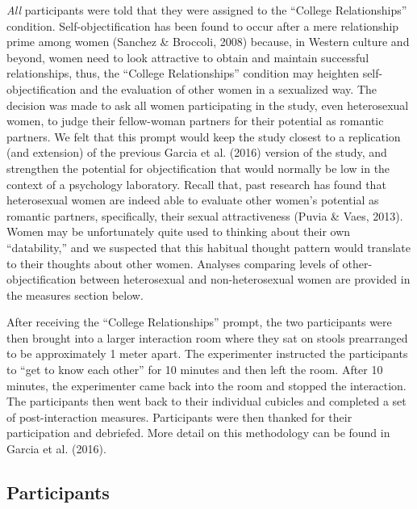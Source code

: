 \documentclass[man]{apa6}
\begin{document}
\emph{All} participants were told that they were assigned to the
\enquote{College Relationships} condition. Self-objectification has been
found to occur after a mere relationship prime among women (Sanchez \&
Broccoli, 2008) because, in Western culture and beyond, women need to
look attractive to obtain and maintain successful relationships, thus,
the \enquote{College Relationships} condition may heighten
self-objectification and the evaluation of other women in a sexualized
way. The decision was made to ask all women participating in the study,
even heterosexual women, to judge their fellow-woman partners for their
potential as romantic partners. We felt that this prompt would keep the
study closest to a replication (and extension) of the previous Garcia et
al. (2016) version of the study, and strengthen the potential for
objectification that would normally be low in the context of a
psychology laboratory. Recall that, past research has found that
heterosexual women are indeed able to evaluate other women's potential
as romantic partners, specifically, their sexual attractiveness (Puvia
\& Vaes, 2013). Women may be unfortunately quite used to thinking about
their own \enquote{datability,} and we suspected that this habitual
thought pattern would translate to their thoughts about other women.
Analyses comparing levels of other-objectification between heterosexual
and non-heterosexual women are provided in the measures section below.

After receiving the \enquote{College Relationships} prompt, the two
participants were then brought into a larger interaction room where they
sat on stools prearranged to be approximately 1 meter apart. The
experimenter instructed the participants to \enquote{get to know each
other} for 10 minutes and then left the room. After 10 minutes, the
experimenter came back into the room and stopped the interaction. The
participants then went back to their individual cubicles and completed a
set of post-interaction measures. Participants were then thanked for
their participation and debriefed. More detail on this methodology can
be found in Garcia et al. (2016).

\subsection{Participants}\label{participants}
\end{document}
